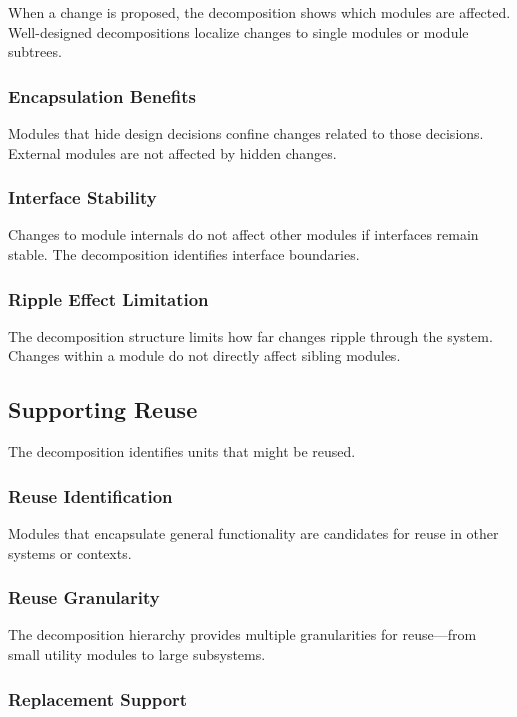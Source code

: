 \documentclass[11pt]{article}
\begin{document}
When a change is proposed, the decomposition shows which modules are affected. Well-designed decompositions localize changes to single modules or module subtrees.

\subsubsection{Encapsulation Benefits}

Modules that hide design decisions confine changes related to those decisions. External modules are not affected by hidden changes.

\subsubsection{Interface Stability}

Changes to module internals do not affect other modules if interfaces remain stable. The decomposition identifies interface boundaries.

\subsubsection{Ripple Effect Limitation}

The decomposition structure limits how far changes ripple through the system. Changes within a module do not directly affect sibling modules.

\subsection{Supporting Reuse}

The decomposition identifies units that might be reused.

\subsubsection{Reuse Identification}

Modules that encapsulate general functionality are candidates for reuse in other systems or contexts.

\subsubsection{Reuse Granularity}

The decomposition hierarchy provides multiple granularities for reuse---from small utility modules to large subsystems.

\subsubsection{Replacement Support}
\end{document}
